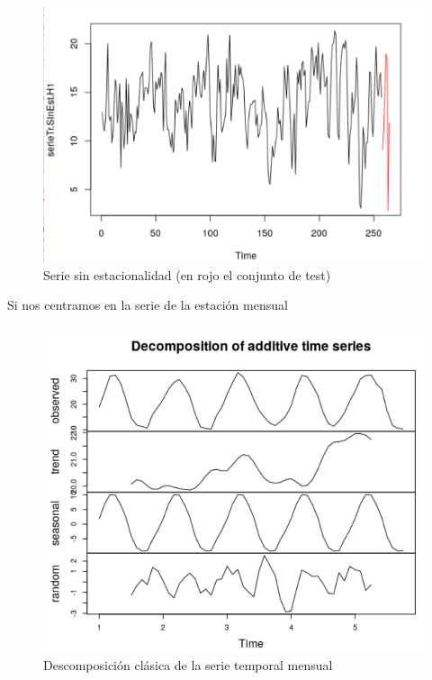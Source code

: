 \begin{figure}[H] %
	\centering
	\includegraphics[scale=0.25]{diaria-Sin-Est.png}  %
	\caption{Serie sin estacionalidad (en rojo el conjunto de test)} 
	\label{fig:diaria-sinest}
\end{figure}

Si nos centramos en la serie de la estación mensual

\begin{figure}[H] %
	\centering
	\includegraphics[scale=0.31]{decom-mensual.png}  %
	\caption{Descomposición clásica de la serie temporal mensual} 
	\label{fig:decom-mensual}
\end{figure}

